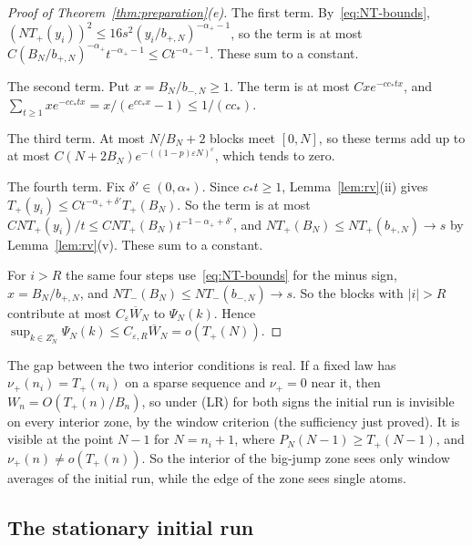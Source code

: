\begin{proof}[Proof of Theorem~\ref{thm:preparation}(e)]
The first term. By~\eqref{eq:NT-bounds},
$(NT_\plus(y_i))^2\le16s^2(y_i/b_{\plus,N})^{-\alpha_\plus-1}$, so the term is at most
$C(B_N/b_{\plus,N})^{-\alpha_\plus}t^{-\alpha_\plus-1}\le Ct^{-\alpha_\plus-1}$. These sum
to a constant.

The second term. Put $x=B_N/b_{\minus,N}\ge1$. The term is at most $Cxe^{-cc_*tx}$,
and $\sum_{t\ge1}xe^{-cc_*tx}=x/(e^{cc_*x}-1)\le1/(cc_*)$.

The third term. At most $N/B_N+2$ blocks meet $[0,N]$, so these terms add up to at
most $C(N+2B_N)e^{-((1-p)\varepsilon N)^c}$, which tends to zero.

The fourth term. Fix $\delta'\in(0,\alpha_*)$. Since $c_*t\ge1$,
Lemma~\ref{lem:rv}(ii) gives $T_\plus(y_i)\le Ct^{-\alpha_\plus+\delta'}T_\plus(B_N)$. So
the term is at most $CNT_\plus(y_i)/t\le CNT_\plus(B_N)t^{-1-\alpha_\plus+\delta'}$, and
$NT_\plus(B_N)\le NT_\plus(b_{\plus,N})\to s$ by Lemma~\ref{lem:rv}(v). These sum to a
constant.

For $i>R$ the same four steps use~\eqref{eq:NT-bounds} for the minus sign,
$x=B_N/b_{\plus,N}$, and $NT_\minus(B_N)\le NT_\minus(b_{\minus,N})\to s$. So the blocks
with $|i|>R$ contribute at most $C_\varepsilon\overline W_N$ to $\Psi_N(k)$. Hence
$\sup_{k\in Z^\varepsilon_N}\Psi_N(k)\le C_{\varepsilon,R}\overline W_N=o(T_\plus(N))$.
\end{proof}

The gap between the two interior conditions is real. If a fixed law has $\nu_\plus(n_i)=T_\plus(n_i)$
on a sparse sequence and $\nu_\plus=0$ near it, then $W_n=O(T_\plus(n)/B_n)$, so under
(LR) for both signs the initial run is invisible on every interior zone, by the
window criterion (the sufficiency just proved). It is visible at the point $N-1$ for
$N=n_i+1$, where $P_N(N-1)\ge T_\plus(N-1)$, and $\nu_\plus(n)\ne o(T_\plus(n))$. So
the interior of the big-jump zone sees only window averages of the initial run,
while the edge of the zone sees single atoms.

\subsection{The stationary initial run}\label{sec:prep-stationary}

